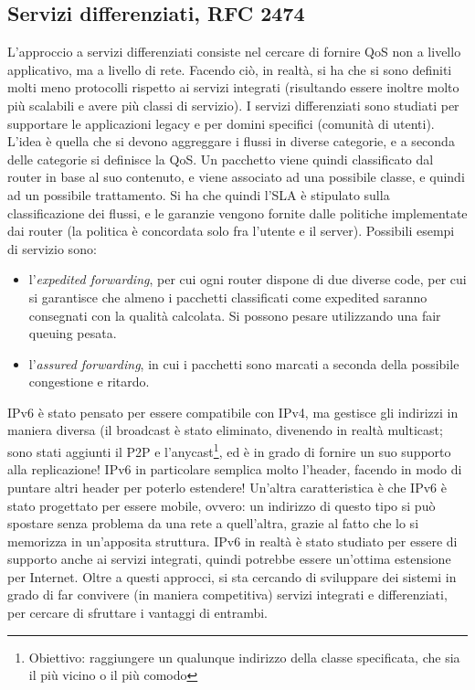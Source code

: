 \subsection{Servizi differenziati, RFC 2474}
L'approccio a servizi differenziati consiste nel cercare di fornire QoS non a livello applicativo, ma a livello di
rete. Facendo ciò, in realtà, si ha che si sono definiti molti meno protocolli rispetto ai servizi integrati
(risultando essere inoltre molto più scalabili e avere più classi di servizio). I servizi differenziati sono studiati per supportare le applicazioni legacy e per domini specifici (comunità di utenti). L'idea è quella che si devono aggreggare i flussi in diverse categorie, e a seconda delle categorie si definisce la QoS. Un pacchetto viene quindi classificato dal router in base al suo contenuto, e viene associato ad una possibile classe, e quindi ad un possibile trattamento.
Si ha che quindi l'SLA è stipulato sulla classificazione dei flussi, e le garanzie vengono fornite dalle politiche
implementate dai router (la politica è concordata solo fra l'utente e il server).
Possibili esempi di servizio sono:
\begin{itemize}
 \item l'\textit{expedited forwarding}, per cui ogni router dispone di due diverse code, per cui si garantisce che
 almeno i pacchetti classificati come expedited saranno consegnati con la qualità calcolata. Si possono pesare
 utilizzando una fair queuing pesata.
 \item l'\textit{assured forwarding}, in cui i pacchetti sono marcati a seconda della possibile congestione e ritardo.
\end{itemize}
IPv6 è stato pensato per essere compatibile con IPv4, ma gestisce gli indirizzi in maniera diversa (il broadcast è
stato eliminato, divenendo in realtà multicast; sono stati aggiunti il P2P e l'anycast\footnote{Obiettivo: raggiungere un qualunque indirizzo della classe specificata, che sia il più vicino o il più comodo}, ed è in grado di fornire un
suo supporto alla replicazione! IPv6 in particolare semplica molto l'header, facendo in modo di puntare altri header per poterlo estendere! Un'altra caratteristica è che IPv6 è stato progettato per essere mobile, ovvero: un indirizzo di questo tipo si può spostare senza problema da una rete a quell'altra, grazie al fatto che lo si memorizza in
un'apposita struttura. IPv6 in realtà è stato studiato per essere di supporto anche ai servizi integrati, quindi
potrebbe essere un'ottima estensione per Internet.
Oltre a questi approcci, si sta cercando di sviluppare dei sistemi in grado di far convivere (in maniera competitiva)
servizi integrati e differenziati, per cercare di sfruttare i vantaggi di entrambi.